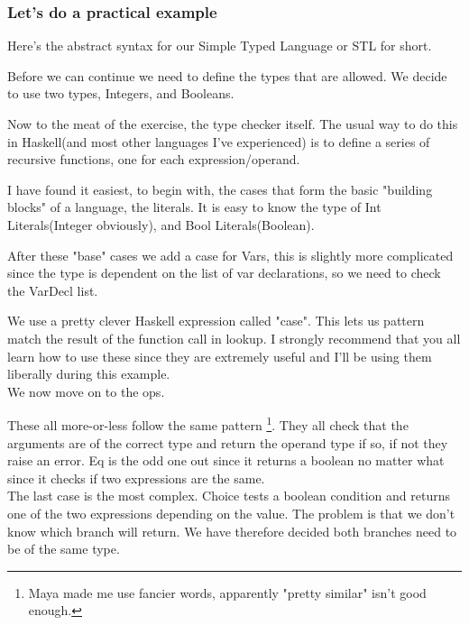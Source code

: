         \subsubsection*{Let's do a practical example}
        Here's the abstract syntax for our Simple Typed Language or STL for short.
        
        Before we can continue we need to define the types that are allowed. We decide to use two types, Integers, and Booleans.
        
        
        Now to the meat of the exercise, the type checker itself.
        The usual way to do this in Haskell(and most other languages I've experienced) is to define a series of recursive functions, one for each
        expression/operand.
        
        
        I have found it easiest, to begin with, the cases that form the basic "building blocks" of a language, the literals. It is easy to know the type of Int Literals(Integer obviously), and Bool Literals(Boolean).
        
        
        After these "base" cases we add a case for Vars, this is slightly more complicated since the type is dependent on the list of var declarations, 
        so we need to check the VarDecl list.
        
        
        We use a pretty clever Haskell expression called "case". This lets us pattern match the result of the function call in lookup. 
        I strongly recommend that you all learn how to use these since they are extremely useful and I'll be using them liberally during this example.\\
        We now move on to the ops.
        
        
        These all more-or-less follow the same pattern \footnote{Maya made me use fancier words, apparently "pretty similar" isn't good enough.}.
        They all check that the arguments are of the correct type and return the operand type if so, if not they raise an error.
        Eq is the odd one out since it returns a boolean no matter what since it checks if two expressions are the same.\\
        The last case is the most complex. Choice tests a boolean condition and returns one of the two expressions depending on the value.
        The problem is that we don't know which branch will return. We have therefore decided both branches need to be of the same type.
        
           
